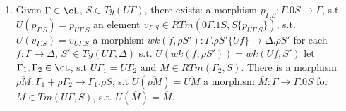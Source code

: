 \documentclass[12pt,a4paper]{article}
\begin{document}
\begin{enumerate}[noitemsep]
  \item Given $\Gamma \in \cL$, $S \in Ty(U\Gamma)$, there exists:
  \subitem a morphism $p_{\Gamma.S} : \Gamma. 0S \to \Gamma$, s.t. $U(p_{\Gamma.S})=p_{U\Gamma.S}$
  \subitem an element $v_{\Gamma.S} \in RTm(0\Gamma.1S, S\{p_{U\Gamma.S}\})$, s.t. $U(v_{\Gamma.S})=v_{U\Gamma.S}$
  \subitem a morphism $wk(f, \rho S') : \Gamma.\rho S'\{Uf\} \to \Delta.\rho S'$ for each $f : \Gamma \to \Delta$, $S' \in Ty(U\Gamma, \Delta)$ s.t. $U(wk(f, \rho S'))=wk(Uf, S')$
  \subitem let $\Gamma_1, \Gamma_2 \in \cL$, s.t $U\Gamma_1 = U\Gamma_2$ and $M \in RTm(\Gamma_2, S)$. There is a morphism $\overline{\rho M} : \Gamma_1 + \rho \Gamma_2 \to \Gamma_1 . \rho S$, s.t $U(\overline{\rho M})= \overline{UM}$
  \subitem a morphism $\overline{M} : \Gamma \to \Gamma.0S$ for $M \in Tm(U\Gamma, S)$, s.t. $U(\overline{M})=\overline{M}$.
\end{enumerate}
\end{document}
